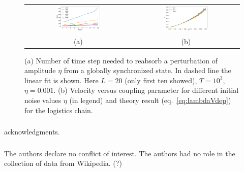 \documentclass[runningheads]{llncs}
\begin{document}
\begin{figure}
    \centering
    \begin{tabular}{c c}
    \includegraphics[width=0.45\textwidth]{logisticNoisePropagation_layerVsdeltaTimestep.pdf}  & \includegraphics[width=0.45\textwidth]{logisticNoisePropagation_pVsVelocity.pdf} \\
        (a) & (b)
    \end{tabular}
    \caption{(a) Number of time step needed to reabsorb a perturbation of amplitude $\eta$ from a globally synchronized state. In dashed line the linear fit is shown. Here $L=20$ (only first ten showed), $T=10^3$, $\eta = 0.001$.
    (b) Velocity versus coupling parameter for different initial noise values $\eta$ (in legend) and theory result (eq.~\ref{eq:lambdaVdep}) for the logistics chain.}
    \label{fig:logisticNoise_propagation}
\end{figure}






%
%
\begin{credits}
\subsubsection{\ackname} acknowledgments.

\subsubsection{\discintname}
The authors declare no conflict of interest. The authors had no role in the collection of data from Wikipedia. (?)
\end{credits}
%
%


\end{document}
